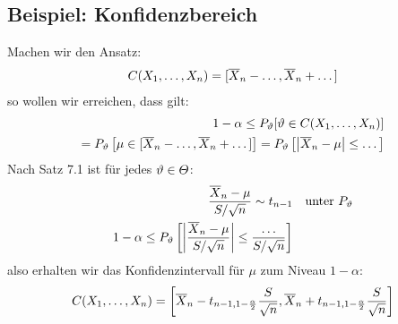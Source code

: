 \subsection*{Beispiel: Konfidenzbereich}
Machen wir den Ansatz:
\begin{align*}
  C (X_1, \dots, X_n) = [\overline{X}_n - \dots, \overline{X}_n + \dots]
\end{align*}
so wollen wir erreichen, dass gilt:
\begin{align*}
  1 - \alpha \leq P_\vartheta[\vartheta \in  C (X_1, \dots, X_n)] \\
  = P_\vartheta \left[ \mu \in [\overline{X}_n - \dots, \overline{X}_n + \dots] \right]
  = P_\vartheta \left[ \abs{\overline{X}_n - \mu} \leq \dots \right]
\end{align*}
Nach Satz 7.1 ist für jedes $\vartheta \in \varTheta$:
\begin{align*}
  \frac{\overline{X}_n - \mu}{S / \sqrt{n}} \sim t_{n-1} &  & \text{unter } P_\vartheta \\
  1 - \alpha \leq P_\vartheta \left[ \abs{\frac{\overline{X}_n - \mu}{S / \sqrt{n}}} \leq \frac{\dots}{S / \sqrt{n}} \right]
\end{align*}
also erhalten wir das Konfidenzintervall für $\mu$ zum Niveau $1 - \alpha$:
\begin{align*}
  C (X_1, \dots, X_n) = \left[ \overline{X}_n - t_{n-1, 1 - \frac{\alpha}{2}} \frac{S}{\sqrt{n}}, \overline{X}_n + t_{n-1, 1 - \frac{\alpha}{2}} \frac{S}{\sqrt{n}} \right]
\end{align*}
\BoxEnd{}
